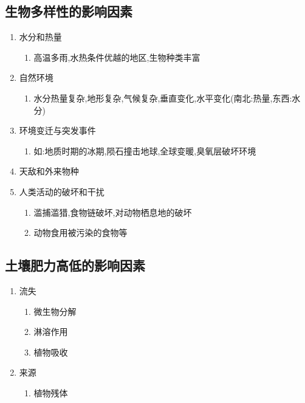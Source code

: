 \documentclass[a4paper]{article}
\begin{document}
    \subsection{生物多样性的影响因素}
    \begin{enumerate}
        \item 水分和热量
        \begin{enumerate}
            \item 高温多雨,水热条件优越的地区,生物种类丰富
        \end{enumerate}
        \item 自然环境
        \begin{enumerate}
            \item 水分热量复杂,地形复杂,气候复杂,垂直变化,水平变化(南北:热量,东西:水分)
        \end{enumerate}
        \item 环境变迁与突发事件
        \begin{enumerate}
            \item 如:地质时期的冰期,陨石撞击地球,全球变暖,臭氧层破坏环境
        \end{enumerate}
        \item 天敌和外来物种
        \item 人类活动的破坏和干扰
        \begin{enumerate}
            \item 滥捕滥猎,食物链破坏,对动物栖息地的破坏
            \item 动物食用被污染的食物等
        \end{enumerate}
    \end{enumerate}
    \subsection{土壤肥力高低的影响因素}
    \begin{enumerate}
        \item 流失
        \begin{enumerate}
            \item 微生物分解
            \item 淋溶作用
            \item 植物吸收
        \end{enumerate}
        \item 来源
        \begin{enumerate}
            \item 植物残体
        \end{enumerate}
    \end{enumerate}
\end{document}
